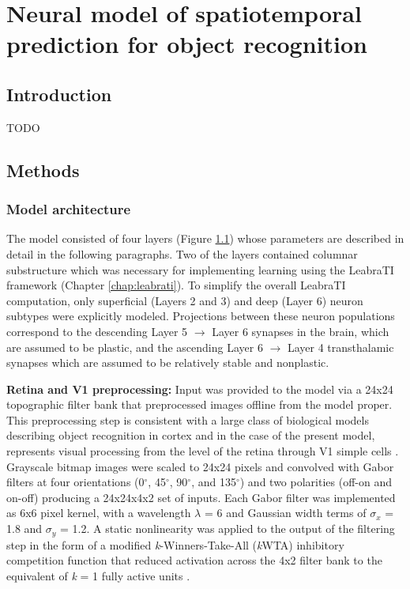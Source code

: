 \documentclass[dwyatte_dissertation.tex]{subfiles}
\begin{document}
\chapter{Neural model of spatiotemporal prediction for object recognition}

\section{Introduction}
TODO

\section{Methods}

\subsection{Model architecture}

The model consisted of four layers (Figure \ref{fig:v1_v2}) whose parameters are described in detail in the following paragraphs. Two of the layers contained columnar substructure which was necessary for implementing learning using the LeabraTI framework (Chapter \ref{chap:leabrati}). To simplify the overall LeabraTI computation, only superficial (Layers 2 and 3) and deep (Layer 6) neuron subtypes were explicitly modeled. Projections between these neuron populations correspond to the descending Layer 5 $\rightarrow$ Layer 6 synapses in the brain, which are assumed to be plastic, and the ascending Layer 6 $\rightarrow$ Layer 4 transthalamic synapses which are assumed to be relatively stable and nonplastic.

\begin{figure}[h!]
\begin{center}
\end{center}
\caption{}{}
\label{fig:v1_v2}
\end{figure}

\textbf{Retina and V1 preprocessing:} Input was provided to the model via a 24x24 topographic filter bank that preprocessed images offline from the model proper. This preprocessing step is consistent with a large class of biological models describing object recognition in cortex \cite[e.g.,]{RiesenhuberPoggio99,SerreOlivaPoggio07,OReillyWyatteHerdEtAl13} and in the case of the present model, represents visual processing from the level of the retina through V1 simple cells \cite{HubelWiesel62}. Grayscale bitmap images were scaled to 24x24 pixels and convolved with Gabor filters at four orientations (0$^\circ$, 45$^\circ$, 90$^\circ$, and 135$^\circ$) and two polarities (off-on and on-off) producing a 24x24x4x2 set of inputs. Each Gabor filter was implemented as 6x6 pixel kernel, with a wavelength $\lambda$ = 6 and Gaussian width terms of $\sigma_x$ = 1.8 and $\sigma_y$ = 1.2. A static nonlinearity was applied to the output of the filtering step in the form of a modified \textit{k}-Winners-Take-All (\textit{k}WTA) inhibitory competition function that reduced activation across the 4x2 filter bank to the equivalent of \textit{k} = 1 fully active units \cite[see][Supporting Information]{OReillyWyatteHerdEtAl13}.
\end{document}
